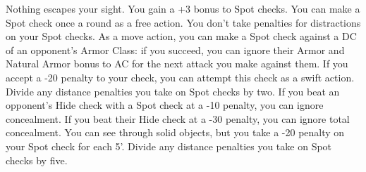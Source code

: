 {Nothing escapes your sight.}
{You gain a +3 bonus to Spot checks.}
{You can make a Spot check once a round as a free action. You don't take penalties for distractions on your Spot checks.}
{As a move action, you can make a Spot check against a DC of an opponent's Armor Class: if you succeed, you can ignore their Armor and Natural Armor bonus to AC for the next attack you make against them. If you accept a -20 penalty to your check, you can attempt this check as a swift action. Divide any distance penalties you take on Spot checks by two.}
{If you beat an opponent's Hide check with a Spot check at a -10 penalty, you can ignore concealment. If you beat their Hide check at a -30 penalty, you can ignore total concealment.}
{You can see through solid objects, but you take a -20 penalty on your Spot check for each 5'. Divide any distance penalties you take on Spot checks by five.}